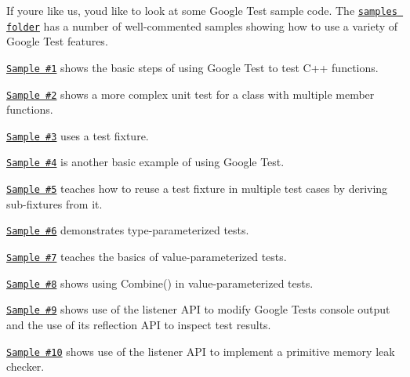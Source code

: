 If you\textquotesingle{}re like us, you\textquotesingle{}d like to look at some Google Test sample code. The \href{../samples}{\tt samples folder} has a number of well-\/commented samples showing how to use a variety of Google Test features.


\begin{DoxyItemize}
\item \href{../samples/sample1_unittest.cc}{\tt Sample \#1} shows the basic steps of using Google Test to test C++ functions.
\item \href{../samples/sample2_unittest.cc}{\tt Sample \#2} shows a more complex unit test for a class with multiple member functions.
\item \href{../samples/sample3_unittest.cc}{\tt Sample \#3} uses a test fixture.
\item \href{../samples/sample4_unittest.cc}{\tt Sample \#4} is another basic example of using Google Test.
\item \href{../samples/sample5_unittest.cc}{\tt Sample \#5} teaches how to reuse a test fixture in multiple test cases by deriving sub-\/fixtures from it.
\item \href{../samples/sample6_unittest.cc}{\tt Sample \#6} demonstrates type-\/parameterized tests.
\item \href{../samples/sample7_unittest.cc}{\tt Sample \#7} teaches the basics of value-\/parameterized tests.
\item \href{../samples/sample8_unittest.cc}{\tt Sample \#8} shows using {\ttfamily Combine()} in value-\/parameterized tests.
\item \href{../samples/sample9_unittest.cc}{\tt Sample \#9} shows use of the listener A\+PI to modify Google Test\textquotesingle{}s console output and the use of its reflection A\+PI to inspect test results.
\item \href{../samples/sample10_unittest.cc}{\tt Sample \#10} shows use of the listener A\+PI to implement a primitive memory leak checker. 
\end{DoxyItemize}